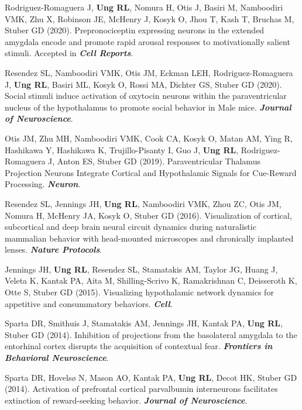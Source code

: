 \begin{etaremune}
  \item Rodriguez-Romaguera J\textsuperscript{\textasteriskcentered}, \textbf{Ung RL\textsuperscript{\textasteriskcentered}}, Nomura H\textsuperscript{\textasteriskcentered}, Otis J, Basiri M, Namboodiri VMK, Zhu X, Robinson JE, McHenry J, Kosyk O, Jhou T, Kash T, Bruchas M, Stuber GD (2020). Prepronociceptin expressing neurons in the extended amygdala encode and promote rapid arousal responses to motivationally salient stimuli. Accepted in \textbf{\textit{Cell Reports}}.
  \item Resendez SL, Namboodiri VMK, Otis JM, Eckman LEH, Rodriguez-Romaguera J, \textbf{Ung RL}, Basiri ML, Kosyk O, Rossi MA, Dichter GS, Stuber GD (2020). Social stimuli induce activation of oxytocin neurons within the paraventricular nucleus of the hypothalamus to promote social behavior in Male mice. \textbf{\textit{Journal of Neuroscience}}.
  \item Otis JM\textsuperscript{\textasteriskcentered}, Zhu MH\textsuperscript{\textasteriskcentered}, Namboodiri VMK, Cook CA, Kosyk O, Matan AM, Ying R, Hashikawa Y, Hashikawa K, Trujillo-Pisanty I, Guo J, \textbf{Ung RL}, Rodriguez-Romaguera J, Anton ES, Stuber GD (2019). Paraventricular Thalamus Projection Neurons Integrate Cortical and Hypothalamic Signals for Cue-Reward Processing. \textbf{\textit{Neuron}}.
  \item Resendez SL, Jennings JH, \textbf{Ung RL}, Namboodiri VMK, Zhou ZC, Otis JM, Nomura H, McHenry JA, Kosyk O, Stuber GD (2016). Visualization of cortical, subcortical and deep brain neural circuit dynamics during naturalistic mammalian behavior with head-mounted microscopes and chronically implanted lenses. \textbf{\textit{Nature Protocols}}.
  \item Jennings JH\textsuperscript{\textasteriskcentered}, \textbf{Ung RL\textsuperscript{\textasteriskcentered}}, Resendez SL, Stamatakis AM, Taylor JG, Huang J, Veleta K, Kantak PA, Aita M, Shilling-Scrivo K, Ramakrishnan C, Deisseroth K, Otte S, Stuber GD (2015). Visualizing hypothalamic network dynamics for appetitive and consummatory behaviors. \textbf{\textit{Cell}}.
  \item Sparta DR, Smithuis J, Stamatakis AM, Jennings JH, Kantak PA, \textbf{Ung RL}, Stuber GD (2014). Inhibition of projections from the basolateral amygdala to the entorhinal cortex disrupts the acquisition of contextual fear. \textbf{\textit{Frontiers in Behavioral Neuroscience}}.
  \item Sparta DR, Hovels{\o} N, Mason AO, Kantak PA, \textbf{Ung RL}, Decot HK, Stuber GD (2014). Activation of prefrontal cortical parvalbumin interneurons facilitates extinction of reward-seeking behavior. \textbf{\textit{Journal of Neuroscience}}.

\end{etaremune}
